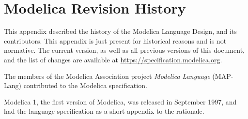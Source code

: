 \chapter{Modelica Revision History}\label{modelica-revision-history}

This appendix described the history of the Modelica Language Design, and its contributors.
This appendix is just present for historical reasons and is not normative.
The current version, as well as all previous versions of this document, and the list of changes are available at \url{https://specification.modelica.org}.

The members of the Modelica Association project \emph{Modelica Language} (MAP-Lang) contributed to the Modelica specification.

Modelica 1, the first version of Modelica, was released in September 1997, and had the language specification as a short appendix to the rationale.
